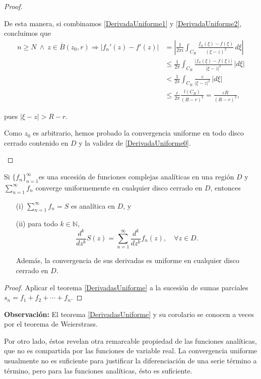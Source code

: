 \begin{proof}
\begin{itemize}
    De esta manera, si combinamos \eqref{DerivadaUniforme1} y \eqref{DerivadaUniforme2}, concluimos que
    \begin{align*}
       n \geq N ~\wedge~  z \in \overline{B}(z_0,r) \Rightarrow \left|f_n'(z) - f'(z) \right| &= \left|\frac{1}{2\pi i} \int_{C_R} \frac{f_n(\xi) - f(\xi)}{(\xi-z)^2}\,d\xi \right| \\
        &\leq \frac{1}{2\pi} \int_{C_R}  \frac{|f_n(\xi) - f(\xi)|}{|\xi-z|^2}\,|d\xi|\\
        & < \frac{1}{2\pi} \int_{C_R}  \frac{\varepsilon}{|\xi-z|^2}\,|d\xi| \\
        &\leq \frac{\varepsilon}{2\pi} \frac{l(C_R)}{(R-r)^2} = \frac{\varepsilon R}{(R-r)^2},
    \end{align*}
    
pues $|\xi - z| > R-r$.

Como $z_0$ es arbitrario, hemos probado la convergencia uniforme en todo disco cerrado contenido en $D$ y la validez de \eqref{DerivadaUniforme0}.
\end{itemize}
\end{proof}

\begin{corolario}
 Si $\{f_n\}_{n=1}^{\infty}$es  una sucesión de funciones complejas analíticas en una región $D$ y   $\sum\limits_{n=1}^{\infty} f_n$ converge uniformemente en cualquier disco cerrado en $D$, entonces
 \begin{itemize}
    \item[(i)] $\sum\limits_{n=1}^{\infty} f_n = S$ es analítica en $D$, y
    
    \item[(ii)] para todo $k \in \mathbb{N}$, 
    $$ \frac{d^k}{dz^k}S(z) = \sum_{n=1}^{\infty} \frac{d^k}{dz^k} f_n(z), \quad \forall z \in D.$$
    
    Además, la convergencia de sus derivadas es uniforme en cualquier disco cerrado en $D$.
\end{itemize}
\end{corolario}

\begin{proof}
Aplicar el teorema \ref{DerivadasUniforme} a la sucesión de sumas parciales $s_n = f_1 + f_2 + \cdots + f_n$.
\end{proof}

\textbf{Observación:} El teorema \ref{DerivadasUniforme} y su corolario se conocen a veces por el teorema de Weierstrass.

Por otro lado, éstos revelan otra remarcable propiedad de las funciones analíticas, que no es compartida por las funciones de variable real. La convergencia uniforme usualmente no es suficiente para justificar la diferenciación de una serie término a término, pero para las funciones analíticas, ésto es suficiente.


